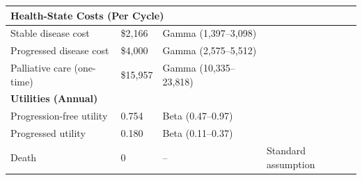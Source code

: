 \documentclass[preprint, 3p,
authoryear]{elsarticle} %
\begin{document}
\begin{table}[ht!]
\begin{tabular}{l l l l}
\midrule
\multicolumn{4}{l}{\textbf{Health-State Costs (Per Cycle)}} \\
\midrule
Stable disease cost       & \$2{,}166 & Gamma (1{,}397--3{,}098)  & \cite{ref7} \\
Progressed disease cost   & \$4{,}000 & Gamma (2{,}575--5{,}512)  & \cite{ref7} \\
Palliative care (one-time)& \$15{,}957& Gamma (10{,}335--23{,}818)& \cite{ref7} \\

\midrule
\multicolumn{4}{l}{\textbf{Utilities (Annual)} } \\
\midrule
Progression-free utility  & 0.754 & Beta (0.47--0.97) & \cite{ref8,ref9} \\
Progressed utility        & 0.180 & Beta (0.11--0.37) & \cite{ref8,ref9} \\
Death                     & 0     & --                & Standard assumption \\

\bottomrule
\end{tabular}
\end{table}

\renewcommand\refname{References}

\end{document}
